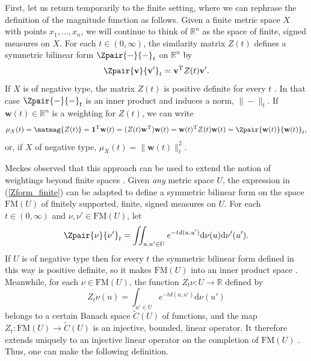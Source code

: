 \documentclass[a4paper, oneside, reqno]{amsart}
\theoremstyle{definition}
\theoremstyle{remark}
\numberwithin{equation}{section}
\renewcommand{\vec}{\mathbf}
\newcommand{\onevector}{\mathbf{1}}
\newcommand{\transpose}{\mathrm{T}}
\newcommand{\R}{\mathbb{R}}
\newcommand{\dd}{\mathrm{d}} %
\newcommand{\finsuppmeas}{\mathrm{FM}}
\begin{document}
First, let us return temporarily to the finite setting, where we can rephrase the definition of the magnitude function as follows. Given a finite metric space \(X\) with points \(x_1,\ldots, x_n\), we will continue to think of \(\R^n\) as the space of finite, signed measures on \(X\). For each \(t \in (0, \infty)\), the similarity matrix \(Z(t)\) defines a symmetric bilinear form \(\Zpair{-}{-}_t\) on \(\R^n\) by
\begin{equation}\label{Zform_finite}
\Zpair{\vec{v}}{\vec{v}'}_t = \vec{v}^\transpose Z(t) \vec{v}'.
\end{equation}
If \(X\) is of negative type, the matrix \(Z(t)\) is positive definite for every \(t\) \cite[Theorem~3.3]{MeckesPositive2013}. In that case \(\Zpair{-}{-}_t\) is an inner product and induces a norm, \(\|-\|_t\). If \(\vec{w}(t) \in \R^n\) is a weighting for \(Z(t)\), we can write
\[\mu_X(t) = \matmag{Z(t)} = \onevector^\transpose \vec{w}(t) =  (Z(t) \vec{w}^\transpose) \vec{w}(t) = \vec{w}(t)^\transpose Z(t) \vec{w}(t) = \Zpair{\vec{w}(t)}{\vec{w}(t)}_t,\]
or, if \(X\) of negative type, \(\mu_X(t) = \|\vec{w}(t)\|_t^2\).

Meckes observed that this approach can be used to extend the notion of weightings beyond finite spaces \cite{Meckes:magnitude-diversity-capacity-dimension}. Given \emph{any} metric space \(U\), the expression in (\ref{Zform_finite}) can be adapted to define a symmetric bilinear form on the space \(\finsuppmeas(U)\) of {finitely supported}, finite, signed measures on \(U\). For each \(t \in (0, \infty)\) and \(\nu, \nu' \in \finsuppmeas(U)\), let
\begin{equation}
\label{wtg_form_real}
\Zpair{\nu}{\nu'}_t = \iint_{u,u' \in U} e^{-td(u,u')} \dd\nu(u) \dd\nu'(u').
\end{equation}
If \(U\) is of negative type then for every \(t\) the symmetric bilinear form defined in this way is positive definite, so it makes \(\finsuppmeas(U)\) into an inner product space \cite[\S3]{Meckes:magnitude-diversity-capacity-dimension}. Meanwhile, for each \(\nu \in \finsuppmeas(U)\), the function \(Z_t\nu \colon U \to \R\) defined by
\[Z_t\nu(u) = \int_{u' \in U} e^{-td(u,u')} \dd \nu(u')\]
belongs to a certain Banach space \(\tilde{C}(U)\) of functions, and the map \(Z_t \colon \finsuppmeas(U) \to \tilde{C}(U)\) is an injective, bounded, linear operator. It therefore extends uniquely to an injective linear operator on the completion of \(\finsuppmeas(U)\) \cite[Proposition~3.2]{Meckes:magnitude-diversity-capacity-dimension}. Thus, one can make the following definition.
\end{document}
